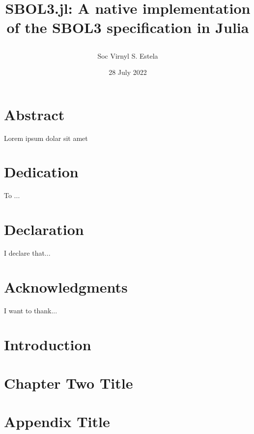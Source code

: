 \documentclass[12pt]{report}
\title{
	{SBOL3.jl: A native implementation of the SBOL3 specification in Julia}

}
\author{Soc Virnyl S. Estela}
\date{28 July 2022}
\begin{document}
\maketitle

\chapter*{Abstract}
Lorem ipsum dolar sit amet

\chapter*{Dedication}
To ...

\chapter*{Declaration}
I declare that...

\chapter*{Acknowledgments}
I want to thank...

\tableofcontents

\chapter{Introduction}


\chapter{Chapter Two Title}


\appendix
\chapter{Appendix Title}

\end{document}
